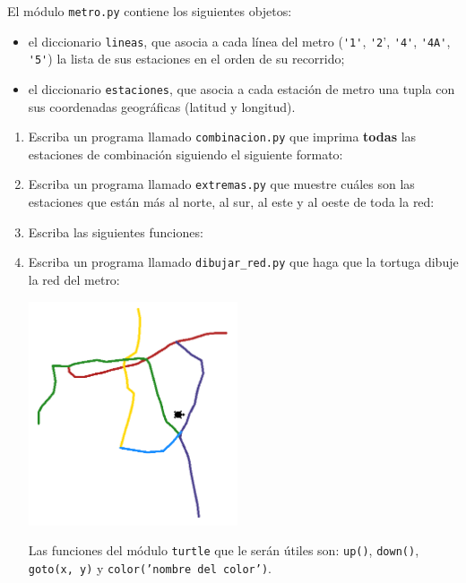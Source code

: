 El módulo \texttt{metro.py} contiene los siguientes objetos:
\begin{itemize}[leftmargin=0pt]
  \item el diccionario \verb!lineas!,
    que asocia a cada línea del metro
    (\verb!'1'!, \verb!'2!', \verb!'4'!, \verb!'4A'!, \verb!'5'!)
    la lista de sus estaciones
    en el orden de su recorrido;
  \item el diccionario \verb!estaciones!,
    que asocia a cada estación de metro
    una tupla con sus coordenadas geográficas
    (latitud y longitud).
\end{itemize}

\begin{enumerate}[leftmargin=0pt,label=\emph{\alph*})]
  \item
    Escriba un programa llamado \texttt{combinacion.py}
    que imprima \textbf{todas} las estaciones de combinación
    siguiendo el siguiente formato:
    

  \item
    Escriba un programa llamado \texttt{extremas.py}
    que muestre cuáles son las estaciones que están
    más al norte, al sur, al este y al oeste
    de toda la red:
    

  \newpage
  \item
    Escriba las siguientes funciones:
    

  \newpage
  \item
    Escriba un programa llamado \verb!dibujar_red.py!
    que haga que la tortuga dibuje la red del metro:

    \includegraphics[height=250px]{metro/red1}

    Las funciones del módulo \texttt{turtle}
    que le serán útiles son:
    \texttt{up()},
    \texttt{down()},
    \texttt{goto(x, y)} y
    \texttt{color('nombre del color')}.


\end{enumerate}
